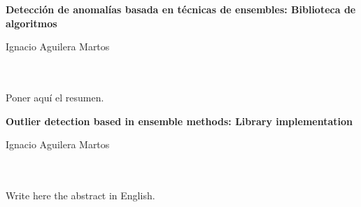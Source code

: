 \chapter*{}






\cleardoublepage
\thispagestyle{empty}

\begin{center}
{\large\bfseries Detección de anomalías basada en técnicas de ensembles: Biblioteca de algoritmos}\\
\end{center}
\begin{center}
Ignacio Aguilera Martos\\
\end{center}

\\

\vspace{0.7cm}
\\

Poner aquí el resumen.
\cleardoublepage


\thispagestyle{empty}


\begin{center}
{\large\bfseries Outlier detection based in ensemble methods: Library implementation}\\
\end{center}
\begin{center}
Ignacio Aguilera Martos\\
\end{center}

\\

\vspace{0.7cm}
\\

Write here the abstract in English.

\chapter*{}
\thispagestyle{empty}

